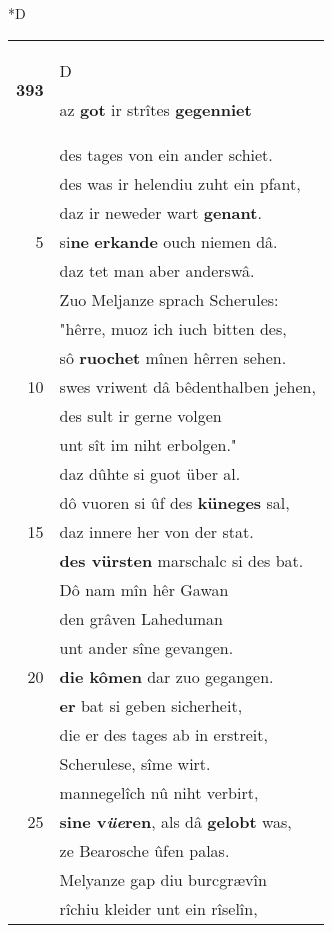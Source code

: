 \documentclass[8pt,a4paper,notitlepage]{article}
\begin{document}
\begin{table}[ht]
\begin{minipage}[t]{0.5\linewidth}
\small
\begin{center}*D
\end{center}
\begin{tabular}{rl}
\textbf{393} & \begin{large}D\end{large}az \textbf{got} ir strîtes \textbf{gegenniet}\\ 
 & des tages von ein ander schiet.\\ 
 & des was ir helendiu zuht ein pfant,\\ 
 & daz ir neweder wart \textbf{genant}.\\ 
5 & si\textbf{ne} \textbf{erkande} ouch niemen dâ.\\ 
 & daz tet man aber anderswâ.\\ 
 & Zuo Meljanze sprach Scherules:\\ 
 & "hêrre, muoz ich iuch bitten des,\\ 
 & sô \textbf{ruochet} mînen hêrren sehen.\\ 
10 & swes vriwent dâ bêdenthalben jehen,\\ 
 & des sult ir gerne volgen\\ 
 & unt sît im niht erbolgen."\\ 
 & daz dûhte si guot über al.\\ 
 & dô vuoren si ûf des \textbf{küneges} sal,\\ 
15 & daz innere her von der stat.\\ 
 & \textbf{des vürsten} marschalc si des bat.\\ 
 & Dô nam mîn hêr Gawan\\ 
 & den grâven Laheduman\\ 
 & unt ander sîne gevangen.\\ 
20 & \textbf{die kômen} dar zuo gegangen.\\ 
 & \textbf{er} bat si geben sicherheit,\\ 
 & die er des tages ab in erstreit,\\ 
 & Scherulese, sîme wirt.\\ 
 & mannegelîch nû niht verbirt,\\ 
25 & \textbf{sine v\textit{üe}ren}, als dâ \textbf{gelobt} was,\\ 
 & ze Bearosche ûfen palas.\\ 
 & Melyanze gap diu burcgrævîn\\ 
 & rîchiu kleider unt ein rîselîn,\\ 

\end{tabular}
\end{minipage}
\end{table}
\end{document}
